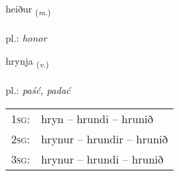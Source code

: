 \documentclass[frontgrid, backgrid]{flacards}\usepackage[]{graphicx}\usepackage[]{xcolor}
\begin{document}
\renewcommand{\flhead}{\vskip5pt \fboxsep=0pt {\small\bfseries\footnotesize Nafnorð | rzeczownik}}
\renewcommand{\fcfoot}{\vskip5pt \fboxsep=0pt \hspace{2pt}{\small\bfseries\footnotesize 3K}}

\renewcommand{\blhead}{\vskip5pt {\small\bfseries\footnotesize Nafnorð | rzeczownik }}
\renewcommand{\bcfoot}{\vskip5pt \hspace{2pt}{\small\bfseries\footnotesize 3K}}


{heiður \small{\textsubscript{(\textit{m.})}} \\[1ex] %
\textphonetic{[heiːðʏr]} \\
pl.: \emph{honor} \\  [2ex]
\renewcommand*{\arraystretch}{0.8}
}

\renewcommand{\flhead}{\vskip5pt \fboxsep=0pt {\small\bfseries\footnotesize Sagnorð | czasownik}}
\renewcommand{\fcfoot}{\vskip5pt \fboxsep=0pt \hspace{2pt}{\small\bfseries\footnotesize 3K}}

\renewcommand{\blhead}{\vskip5pt {\small\bfseries\footnotesize Sagnorð | czasownik }}
\renewcommand{\bcfoot}{\vskip5pt \hspace{2pt}{\small\bfseries\footnotesize 3K}}


{hrynja \small{\textsubscript{(\textit{v.})}} \\[1ex] %
\textphonetic{[r̥ɪnja]} \\
pl.: \emph{paść, padać} \\  [2ex]
\renewcommand*{\arraystretch}{0.8}
\begin{tabular}{p{1cm}l}
\textsc{1sg}: & hryn -- hrundi -- hrunið \\ 
\textsc{2sg}: & hrynur -- hrundir -- hrunið \\ 
\textsc{3sg}: & hrynur -- hrundi -- hrunið \\ 
\end{tabular}
}
\end{document}
